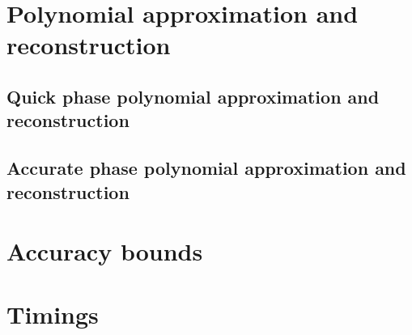 \section{Polynomial approximation and reconstruction}\label{sec:asinpolynomial}

\subsection{Quick phase polynomial approximation and reconstruction}\label{subsec:asinquickpolynomial}

\subsection{Accurate phase polynomial approximation and reconstruction}\label{subsec:asinaccpolynomial}

\section{Accuracy bounds}\label{sec:asinaccuracy}

\section{Timings}\label{sec:asintiming}
